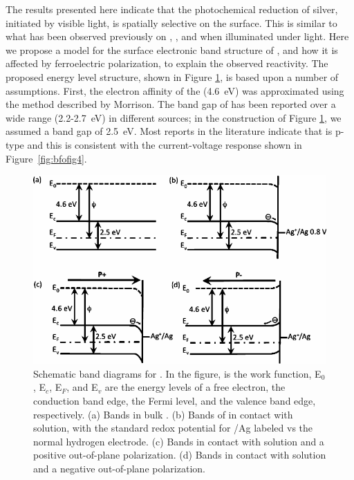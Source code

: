 The results presented here indicate that the photochemical reduction of silver, initiated
by visible light, is spatially selective on the  surface. This is similar to
what has been observed previously on , , and  when
illuminated under 
light.\cite{Burbure:2010go,Giocondi:2001bi,Giocondi:2003wc,Lowekamp:1998ks,Dunn:2007ja}
Here we propose a model for the surface electronic band structure of , and how
it is affected by ferroelectric polarization, to explain the observed reactivity. The
proposed energy level structure, shown in Figure \ref{fig:bfofig5}, is based upon a number
of assumptions. First, the electron affinity of the  (\SI{4.6}{\electronvolt})
was approximated using the method described by Morrison.\cite{Morrison:1980va} The band
gap of  has been reported over a wide range (2.2-\SI{2.7}{\electronvolt}) in
different sources;\cite{Basu:2008hd,Choi:2009gh,Gao:2006fg} in the construction of Figure
\ref{fig:bfofig5}, we assumed a band gap of \SI{2.5}{\electronvolt}. Most reports in the
literature indicate that  is p-type\cite{Vengalis:2008vi,Yang:2008fo} and this
is consistent with the current-voltage response shown in Figure~\ref{fig:bfofig4}.
\begin{figure}[htbp]
\begin{center}
\includegraphics[width=\textwidth]{bfofig5.pdf}
\caption[Schematic band diagrams for ]{Schematic band diagrams for .
In the figure,  is the work function, E$_0$, E$_c$, E$_F$, and E$_v$ are the energy levels
of a free electron, the conduction band edge, the Fermi level, and the valence band edge,
respectively. (a) Bands in bulk . (b) Bands of  in contact with
solution, with the standard redox potential for /Ag labeled vs the normal hydrogen
electrode. (c) Bands in contact with solution and a positive out-of-plane polarization.
(d) Bands in contact with solution and a negative out-of-plane polarization.}
\label{fig:bfofig5}
\end{center}
\end{figure}

